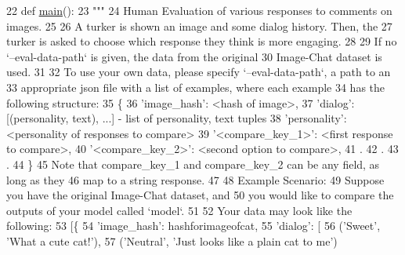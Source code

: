 \begin{DoxyCode}
22 \textcolor{keyword}{def }\hyperlink{namespaceprojects_1_1wizard__of__wikipedia_1_1mturk__evaluation__task_1_1run_ad3ab2c71f8083c3112815c0b363d316b}{main}():
23     \textcolor{stringliteral}{"""}
24 \textcolor{stringliteral}{    Human Evaluation of various responses to comments on images.}
25 \textcolor{stringliteral}{}
26 \textcolor{stringliteral}{    A turker is shown an image and some dialog history. Then, the}
27 \textcolor{stringliteral}{    turker is asked to choose which response they think is more engaging.}
28 \textcolor{stringliteral}{}
29 \textcolor{stringliteral}{    If no `--eval-data-path` is given, the data from the original}
30 \textcolor{stringliteral}{    Image-Chat dataset is used.}
31 \textcolor{stringliteral}{}
32 \textcolor{stringliteral}{    To use your own data, please specify `--eval-data-path`, a path to an}
33 \textcolor{stringliteral}{    appropriate json file with a list of examples, where each example}
34 \textcolor{stringliteral}{    has the following structure:}
35 \textcolor{stringliteral}{        \{}
36 \textcolor{stringliteral}{            'image\_hash': <hash of image>,}
37 \textcolor{stringliteral}{            'dialog': [(personality, text), ...] - list of personality, text tuples}
38 \textcolor{stringliteral}{            'personality': <personality of responses to compare>}
39 \textcolor{stringliteral}{            '<compare\_key\_1>': <first response to compare>,}
40 \textcolor{stringliteral}{            '<compare\_key\_2>': <second option to compare>,}
41 \textcolor{stringliteral}{            .}
42 \textcolor{stringliteral}{            .}
43 \textcolor{stringliteral}{            .}
44 \textcolor{stringliteral}{        \}}
45 \textcolor{stringliteral}{    Note that compare\_key\_1 and compare\_key\_2 can be any field, as long as they}
46 \textcolor{stringliteral}{    map to a string response.}
47 \textcolor{stringliteral}{}
48 \textcolor{stringliteral}{    Example Scenario:}
49 \textcolor{stringliteral}{        Suppose you have the original Image-Chat dataset, and}
50 \textcolor{stringliteral}{        you would like to compare the outputs of your model called `model`.}
51 \textcolor{stringliteral}{}
52 \textcolor{stringliteral}{        Your data may look like the following:}
53 \textcolor{stringliteral}{        [\{}
54 \textcolor{stringliteral}{            'image\_hash': hashforimageofcat,}
55 \textcolor{stringliteral}{            'dialog': [}
56 \textcolor{stringliteral}{                ('Sweet', 'What a cute cat!'),}
57 \textcolor{stringliteral}{                ('Neutral', 'Just looks like a plain cat to me')}

\end{DoxyCode}
